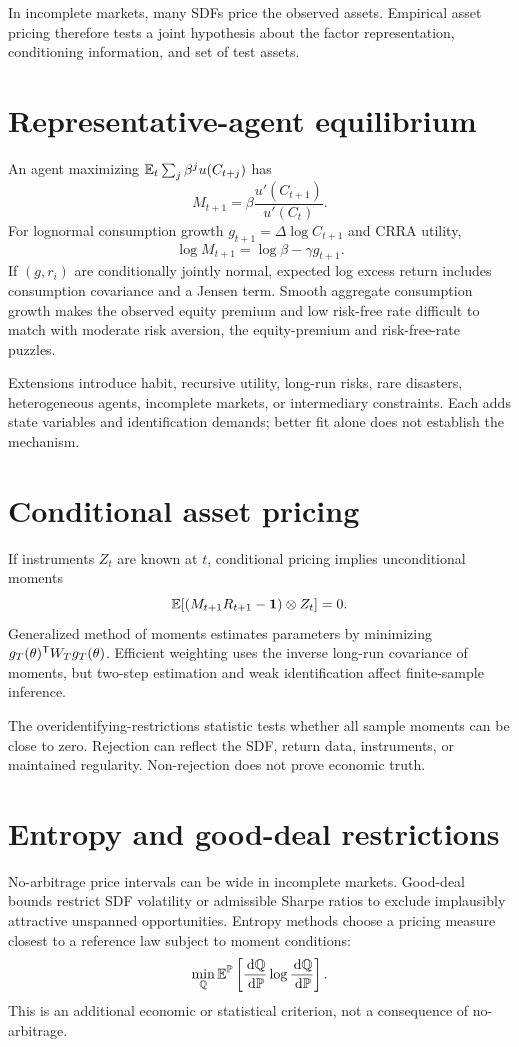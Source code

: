 In incomplete markets, many SDFs price the observed assets. Empirical asset pricing
therefore tests a joint hypothesis about the factor representation, conditioning
information, and set of test assets.

\section{Representative-agent equilibrium}

An agent maximizing $\operatorname{\mathbb E}_t\sum_j\beta^ju(C_{t+j})$ has
\[
M_{t+1}=\beta\frac{u'(C_{t+1})}{u'(C_t)}.
\]
For lognormal consumption growth $g_{t+1}=\Delta\log C_{t+1}$ and CRRA utility,
\[
\log M_{t+1}=\log\beta-\gamma g_{t+1}.
\]
If $(g,r_i)$ are conditionally jointly normal, expected log excess return includes
consumption covariance and a Jensen term. Smooth aggregate consumption growth makes
the observed equity premium and low risk-free rate difficult to match with moderate
risk aversion, the equity-premium and risk-free-rate puzzles.

Extensions introduce habit, recursive utility, long-run risks, rare disasters,
heterogeneous agents, incomplete markets, or intermediary constraints. Each adds
state variables and identification demands; better fit alone does not establish the
mechanism.

\section{Conditional asset pricing}

If instruments $Z_t$ are known at $t$, conditional pricing implies unconditional
moments
\[
\operatorname{\mathbb E}[(M_{t+1}R_{t+1}-\bm 1)\otimes Z_t]=0.
\]
Generalized method of moments estimates parameters by minimizing
$g_T(\theta)^\mathsf T W_Tg_T(\theta)$. Efficient weighting uses the inverse
long-run covariance of moments, but two-step estimation and weak identification
affect finite-sample inference.

The overidentifying-restrictions statistic tests whether all sample moments can be
close to zero. Rejection can reflect the SDF, return data, instruments, or maintained
regularity. Non-rejection does not prove economic truth.

\section{Entropy and good-deal restrictions}

No-arbitrage price intervals can be wide in incomplete markets. Good-deal bounds
restrict SDF volatility or admissible Sharpe ratios to exclude implausibly attractive
unspanned opportunities. Entropy methods choose a pricing measure closest to a
reference law subject to moment conditions:
\[
\min_{\mathbb Q} \operatorname{\mathbb E}^\mathbb P\left[
\frac{\,\mathrm d\mathbb Q}{\,\mathrm d\mathbb P}\log\frac{\,\mathrm d\mathbb Q}{\,\mathrm d\mathbb P}
\right].
\]
This is an additional economic or statistical criterion, not a consequence of
no-arbitrage.

